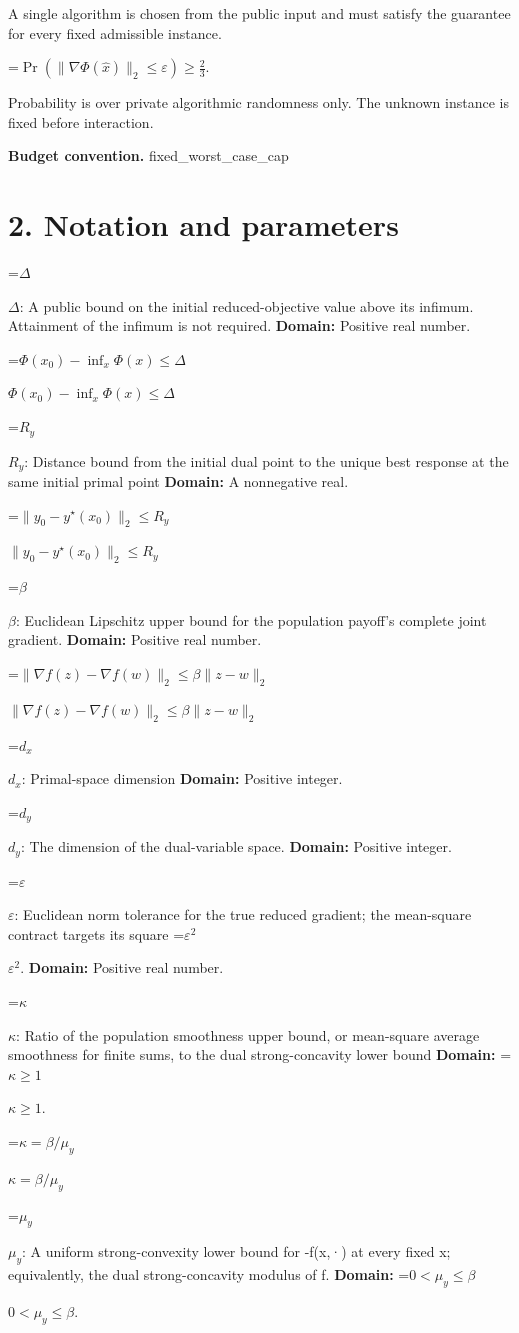 \documentclass[10pt,a4paper]{article}
\newcommand{\AtlasMath}[1]{\par\begingroup\centering\setbox0=\hbox{$\displaystyle #1$}\ifdim\wd0>1.4\linewidth\typeout{ATLAS WIDE FORMULA: \the\wd0}\fi\ifdim\wd0>\linewidth\resizebox{\linewidth}{!}{\box0}\else\box0\fi\par\endgroup}
\newcommand{\AtlasInlineMath}[1]{\begingroup\setbox0=\hbox{$#1$}\ifdim\wd0>.4\linewidth\endgroup\AtlasMath{#1}\else\endgroup$#1$\fi}
\begin{document}
A single algorithm is chosen from the public input and must satisfy the guarantee for every fixed admissible instance.


\AtlasMath{\Pr\!\left(\|\nabla\Phi(\widehat{x})\|_2\le\varepsilon\right)\ge\frac23.}


Probability is over private algorithmic randomness only. The unknown instance is fixed before interaction.

\textbf{Budget convention.} fixed\_\allowbreak{}worst\_\allowbreak{}case\_\allowbreak{}cap

\section{2. Notation and parameters}
\AtlasInlineMath{\Delta}: A public bound on the initial reduced-objective value above its infimum. Attainment of the infimum is not required. \textbf{Domain:} Positive real number.

\AtlasInlineMath{\Phi(x_0)-\inf_x\Phi(x)\le\Delta}

\AtlasInlineMath{R_y}: Distance bound from the initial dual point to the unique best response at the same initial primal point \textbf{Domain:} A nonnegative real.

\AtlasInlineMath{\|y_0-y^\star(x_0)\|_2\le R_y}

\AtlasInlineMath{\beta}: Euclidean Lipschitz upper bound for the population payoff's complete joint gradient. \textbf{Domain:} Positive real number.

\AtlasInlineMath{\|\nabla f(z)-\nabla f(w)\|_2\le\beta\|z-w\|_2}

\AtlasInlineMath{d_x}: Primal-space dimension \textbf{Domain:} Positive integer.

\AtlasInlineMath{d_y}: The dimension of the dual-variable space. \textbf{Domain:} Positive integer.

\AtlasInlineMath{\varepsilon}: Euclidean norm tolerance for the true reduced gradient; the mean-square contract targets its square \AtlasInlineMath{\varepsilon^2}. \textbf{Domain:} Positive real number.

\AtlasInlineMath{\kappa}: Ratio of the population smoothness upper bound, or mean-square average smoothness for finite sums, to the dual strong-concavity lower bound \textbf{Domain:} \AtlasInlineMath{\kappa\ge1}.

\AtlasInlineMath{\kappa=\beta/\mu_y}

\AtlasInlineMath{\mu_y}: A uniform strong-convexity lower bound for -f(x,·) at every fixed x; equivalently, the dual strong-concavity modulus of f. \textbf{Domain:} \AtlasInlineMath{0<\mu_y\le\beta}.
\end{document}
